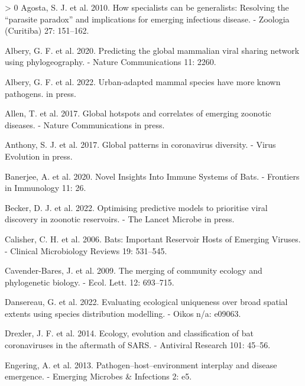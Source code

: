 \documentclass[11pt]{article}
\newlength{\cslhangindent}
\newenvironment{CSLReferences}[3] %
 {%
  \setlength{\parindent}{0pt}
  \ifodd #1 \everypar{\setlength{\hangindent}{\cslhangindent}}\ignorespaces\fi
  \ifnum #2 > 0
  \setlength{\parskip}{#2\baselineskip}
  \fi
 }%
 {}
\begin{document}
\hypertarget{refs}{}
\begin{CSLReferences}{1}{0}
\leavevmode\hypertarget{ref-Agosta2010HowSpe}{}%
Agosta, S. J. et al. 2010. How specialists can be generalists: Resolving
the {``parasite paradox''} and implications for emerging infectious
disease. - Zoologia (Curitiba) 27: 151--162.

\leavevmode\hypertarget{ref-Albery2020PreGlo}{}%
Albery, G. F. et al. 2020. Predicting the global mammalian viral sharing
network using phylogeography. - Nature Communications 11: 2260.

\leavevmode\hypertarget{ref-Albery2022UrbMam}{}%
Albery, G. F. et al. 2022. Urban-adapted mammal species have more known
pathogens. in press.

\leavevmode\hypertarget{ref-Allen2017GloHot}{}%
Allen, T. et al. 2017. Global hotspots and correlates of emerging
zoonotic diseases. - Nature Communications in press.

\leavevmode\hypertarget{ref-Anthony2017GloPat}{}%
Anthony, S. J. et al. 2017. Global patterns in coronavirus diversity. -
Virus Evolution in press.

\leavevmode\hypertarget{ref-Banerjee2020NovIns}{}%
Banerjee, A. et al. 2020. Novel Insights Into Immune Systems of Bats. -
Frontiers in Immunology 11: 26.

\leavevmode\hypertarget{ref-Becker2022OptPre}{}%
Becker, D. J. et al. 2022. Optimising predictive models to prioritise
viral discovery in zoonotic reservoirs. - The Lancet Microbe in press.

\leavevmode\hypertarget{ref-Calisher2006BatImp}{}%
Calisher, C. H. et al. 2006. Bats: Important Reservoir Hosts of Emerging
Viruses. - Clinical Microbiology Reviews 19: 531--545.

\leavevmode\hypertarget{ref-Cavender-Bares2009MerCom}{}%
Cavender-Bares, J. et al. 2009. The merging of community ecology and
phylogenetic biology. - Ecol. Lett. 12: 693--715.

\leavevmode\hypertarget{ref-Dansereau2022EvaEco}{}%
Dansereau, G. et al. 2022. Evaluating ecological uniqueness over broad
spatial extents using species distribution modelling. - Oikos n/a:
e09063.

\leavevmode\hypertarget{ref-Drexler2014EcoEvo}{}%
Drexler, J. F. et al. 2014. Ecology, evolution and classification of bat
coronaviruses in the aftermath of SARS. - Antiviral Research 101:
45--56.

\leavevmode\hypertarget{ref-Engering2013PatHos}{}%
Engering, A. et al. 2013. Pathogen--host--environment interplay and
disease emergence. - Emerging Microbes \& Infections 2: e5.


\end{CSLReferences}
\end{document}
